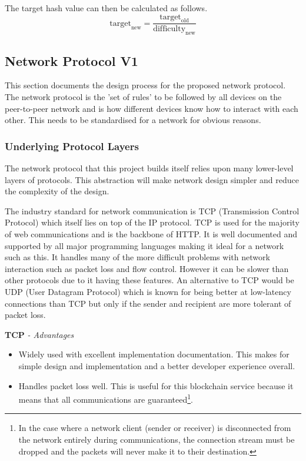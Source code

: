 \documentclass{article}
\begin{document}
The target hash value can then be calculated as follows.
\[\textrm{target}_{\textrm{new}} = \frac{\textrm{target}_{\textrm{old}}} {\textrm{difficulty}_{\textrm{new}}}\]

\newpage
\subsection{Network Protocol V1}
This section documents the design process for the proposed network protocol. The network protocol is the 'set of rules' to be followed by all devices on the peer-to-peer network and is how different devices know how to interact with each other. This needs to be standardised for a network for obvious reasons.

\subsubsection{Underlying Protocol Layers}
The network protocol that this project builds itself relies upon many lower-level layers of protocols. This abstraction will make network design simpler and reduce the complexity of the design.

The industry standard for network communication is TCP (Transmission Control Protocol) which itself lies on top of the IP protocol. TCP is used for the majority of web communications and is the backbone of HTTP. It is well documented and supported by all major programming languages making it ideal for a network such as this. It handles many of the more difficult problems with network interaction such as packet loss and flow control. However it can be slower than other protocols due to it having these features. An alternative to TCP would be UDP (User Datagram Protocol) which is known for being better at low-latency connections than TCP but only if the sender and recipient are more tolerant of packet loss.

\newpage

\textbf{TCP}
\textit{ - Advantages}
\begin{itemize}
    \item Widely used with excellent implementation documentation. This makes for simple design and implementation and a better developer experience overall.
    \item Handles packet loss well. This is useful for this blockchain service because it means that all communications are guaranteed\footnote{In the case where a network client (sender or receiver) is disconnected from the network entirely during communications, the connection stream must be dropped and the packets will never make it to their destination.}.
\end{itemize}
\end{document}
